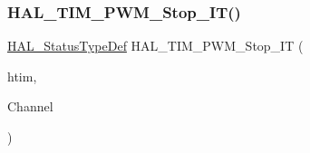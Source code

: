 \subsubsection{\texorpdfstring{H\+A\+L\+\_\+\+T\+I\+M\+\_\+\+P\+W\+M\+\_\+\+Stop\+\_\+\+I\+T()}{HAL\_TIM\_PWM\_Stop\_IT()}}
{\footnotesize\ttfamily \hyperlink{stm32f4xx__hal__def_8h_a63c0679d1cb8b8c684fbb0632743478f}{H\+A\+L\+\_\+\+Status\+Type\+Def} H\+A\+L\+\_\+\+T\+I\+M\+\_\+\+P\+W\+M\+\_\+\+Stop\+\_\+\+IT (\begin{DoxyParamCaption}\item[{\hyperlink{struct_t_i_m___handle_type_def}{T\+I\+M\+\_\+\+Handle\+Type\+Def} $\ast$}]{htim,  }\item[{uint32\+\_\+t}]{Channel }\end{DoxyParamCaption})}

